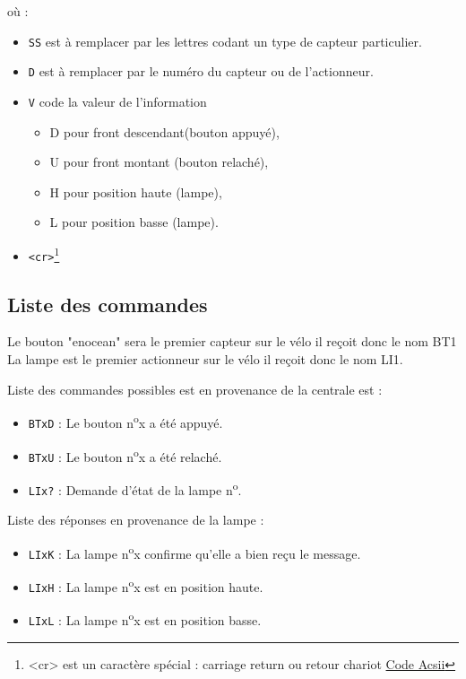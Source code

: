 \documentclass[a4paper, 10pt]{article} %
\newcommand{\numero}{n\textsuperscript{o}}
\begin{document}
où :
\begin{itemize}
  \item \verb|SS| est à remplacer par les lettres codant un type de capteur particulier.
  \item \verb|D| est à remplacer par le numéro du capteur ou de l'actionneur.
  \item \verb|V| code la valeur de l'information
  \begin{itemize}
	\item  D pour front descendant(bouton appuyé),
	\item  U pour front montant (bouton relaché),
	\item  H pour position haute (lampe),
	\item  L pour position basse (lampe).
  \end{itemize}
  \item \verb|<cr>|\footnote{<cr> est un caractère spécial : carriage return ou retour chariot \href{http://fr.wikipedia.org/wiki/American_Standard_Code_for_Information_Interchange}{Code Acsii}}
\end{itemize}

\subsection{Liste des commandes}
Le bouton "enocean" sera le premier capteur sur le vélo il reçoit donc le nom BT1
La lampe est le premier actionneur sur le vélo il reçoit donc le nom LI1.

Liste des commandes possibles est en provenance de la centrale est :
\begin{itemize}

\item 	\verb|BTxD| : Le bouton \numero x a été appuyé.

\item 	\verb|BTxU| : Le bouton \numero x a été relaché.

\item 	\verb|LIx?| : Demande d'état de la lampe \numero.
\end{itemize}

Liste des réponses en provenance de la lampe :
\begin{itemize}
\item 	\verb|LIxK| : La lampe \numero x confirme qu'elle a bien reçu le message.

\item 	\verb|LIxH| : La lampe \numero x est en position haute.

\item 	\verb|LIxL| : La lampe \numero x est en position basse.
\end{itemize}
\end{document}
